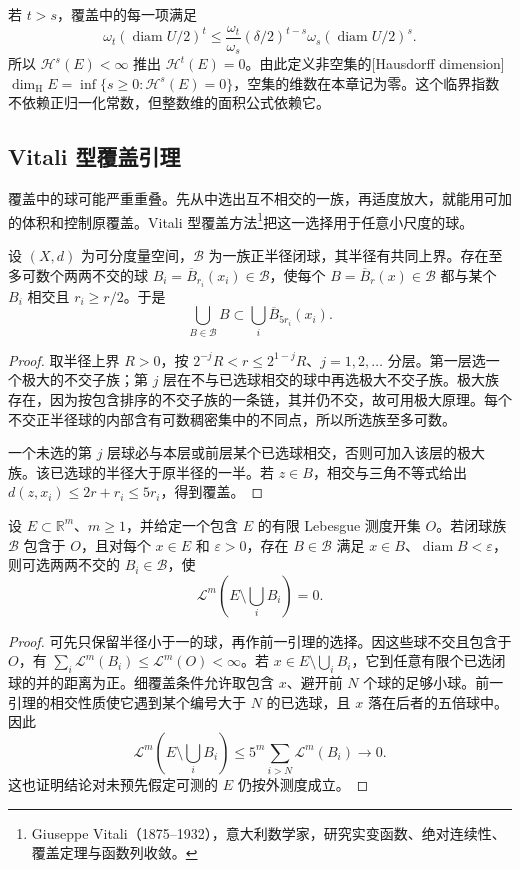 若 \(t>s\)，覆盖中的每一项满足
\[
	\omega_t(\operatorname{diam}U/2)^t
	\le\frac{\omega_t}{\omega_s}(\delta/2)^{t-s}
	\omega_s(\operatorname{diam}U/2)^s.
\]
所以 \(\mathcal H^s(E)<\infty\) 推出 \(\mathcal H^t(E)=0\)。由此定义非空集的[Hausdorff dimension]
\(\dim_{\mathrm H}E=\inf\{s\ge0:\mathcal H^s(E)=0\}\)，空集的维数在本章记为零。这个临界指数不依赖正归一化常数，但整数维的面积公式依赖它。

\subsection{Vitali 型覆盖引理}
\label{g3:subsec:2001:02}
覆盖中的球可能严重重叠。先从中选出互不相交的一族，再适度放大，就能用可加的体积和控制原覆盖。Vitali 型覆盖方法\footnote{Giuseppe Vitali（1875--1932），意大利数学家，研究实变函数、绝对连续性、覆盖定理与函数列收敛。}把这一选择用于任意小尺度的球。

\begin{lemma}\label{g3:lem:five-ball-covering}
	设 \((X,d)\) 为可分度量空间，\(\mathcal B\) 为一族正半径闭球，其半径有共同上界。存在至多可数个两两不交的球 \(B_i=\overline B_{r_i}(x_i)\in\mathcal B\)，使每个 \(B=\overline B_r(x)\in\mathcal B\) 都与某个 \(B_i\) 相交且 \(r_i\ge r/2\)。于是
	\[
		\bigcup_{B\in\mathcal B}B\subset\bigcup_i\overline B_{5r_i}(x_i).
	\]
\end{lemma}
\begin{proof}
	取半径上界 \(R>0\)，按 \(2^{-j}R<r\le2^{1-j}R\)、\(j=1,2,\ldots\) 分层。第一层选一个极大的不交子族；第 \(j\) 层在不与已选球相交的球中再选极大不交子族。极大族存在，因为按包含排序的不交子族的一条链，其并仍不交，故可用极大原理。每个不交正半径球的内部含有可数稠密集中的不同点，所以所选族至多可数。

	一个未选的第 \(j\) 层球必与本层或前层某个已选球相交，否则可加入该层的极大族。该已选球的半径大于原半径的一半。若 \(z\in B\)，相交与三角不等式给出
	\(d(z,x_i)\le2r+r_i\le5r_i\)，得到覆盖。
\end{proof}

\begin{theorem}\label{g3:thm:vitali-lebesgue-covering}
	设 \(E\subset\mathbb R^m\)、\(m\ge1\)，并给定一个包含 \(E\) 的有限 Lebesgue 测度开集 \(O\)。若闭球族 \(\mathcal B\) 包含于 \(O\)，且对每个 \(x\in E\) 和 \(\varepsilon>0\)，存在 \(B\in\mathcal B\) 满足 \(x\in B\)、\(\operatorname{diam}B<\varepsilon\)，则可选两两不交的 \(B_i\in\mathcal B\)，使
	\[
		\mathcal L^m\left(E\setminus\bigcup_iB_i\right)=0.
	\]
\end{theorem}
\begin{proof}
	可先只保留半径小于一的球，再作前一引理的选择。因这些球不交且包含于 \(O\)，有 \(\sum_i\mathcal L^m(B_i)\le\mathcal L^m(O)<\infty\)。若 \(x\in E\setminus\bigcup_iB_i\)，它到任意有限个已选闭球的并的距离为正。细覆盖条件允许取包含 \(x\)、避开前 \(N\) 个球的足够小球。前一引理的相交性质使它遇到某个编号大于 \(N\) 的已选球，且 \(x\) 落在后者的五倍球中。因此
	\[
		\mathcal L^m\left(E\setminus\bigcup_iB_i\right)
		\le5^m\sum_{i>N}\mathcal L^m(B_i)\longrightarrow0.
	\]
	这也证明结论对未预先假定可测的 \(E\) 仍按外测度成立。
\end{proof}

